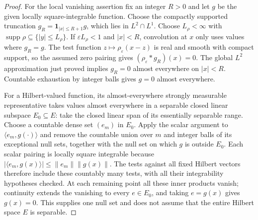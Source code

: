 \documentclass[11pt,a4paper]{article}
\theoremstyle{definition}
\theoremstyle{remark}
\begin{document}
\begin{proof}
For the local vanishing assertion fix an integer $R>0$ and let $g$ be
the given locally square-integrable function. Choose the compactly
supported truncation $g_R=\mathbf1_{|x|\leq R+1}g$, which lies in
$L^2\cap L^1$. Choose $L_\rho<\infty$ with
$\operatorname{supp}\rho\subseteq\{|y|\leq L_\rho\}$.
If $\varepsilon L_\rho<1$ and $|x|<R$, convolution at $x$ only
uses values where $g_R=g$. The test function
$z\mapsto\rho_\varepsilon(x-z)$ is real and smooth with compact
support, so the assumed zero pairing gives
$(\rho_\varepsilon*g_R)(x)=0$. The global $L^2$ approximation just
proved implies $g_R=0$ almost everywhere on $|x|<R$.
Countable exhaustion by integer balls gives $g=0$ almost everywhere.

For a Hilbert-valued function, its almost-everywhere strongly measurable
representative takes values almost everywhere in a separable closed
linear subspace $E_0\subseteq E$: take the closed linear span of its
essentially separable range. Choose a countable dense set $(e_m)$ in
$E_0$. Apply the scalar argument to $\langle e_m,g(\cdot)\rangle$
and remove the countable union over $m$ and integer balls of its
exceptional null sets, together with the null set on which $g$ is
outside $E_0$. Each scalar pairing is locally square integrable because
$|\langle e_m,g(x)\rangle|\leq\|e_m\|\|g(x)\|$. The tests
against all fixed Hilbert vectors therefore include these countably
many tests, with all their integrability hypotheses checked. At each remaining point all
these inner products vanish; continuity extends the vanishing to every
$e\in E_0$, and taking $e=g(x)$ gives $g(x)=0$. This supplies one
null set and does not assume that the entire Hilbert space $E$ is separable.
\end{proof}
\end{document}
